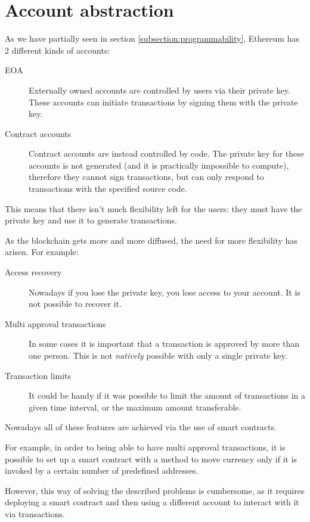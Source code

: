 \documentclass[12pt]{article}
\begin{document}
\section{Account abstraction} \label{section:account_abstraction}
As we have partially seen in section \ref{subsection:programmability}, Ethereum has 2 different kinds of accounts:
\begin{description}
    \item[EOA] Externally owned accounts are controlled by users via their private key. These accounts can initiate transactions by signing them with the private key.
    \item[Contract accounts] Contract accounts are instead controlled by code. The private key for these accounts is not generated (and it is practically impossible to compute), therefore they cannot sign transactions, but can only respond to transactions with the specified source code. 
\end{description}

This means that there isn't much flexibility left for the users: they must have the private key and use it to generate transactions.

As the blockchain gets more and more diffused, the need for more flexibility has arisen. For example:
\begin{description}
    \item[Access recovery] Nowadays if you lose the private key, you lose access to your account. It is not possible to recover it.
    \item[Multi approval transactions] In some cases it is important that a transaction is approved by more than one person. This is not \emph{natively} possible with only a single private key.
    \item[Transaction limits] It could be handy if it was possible to limit the amount of transactions in a given time interval, or the maximum amount transferable. 
\end{description}

Nowadays all of these features are achieved via the use of smart contracts. 

For example, in order to being able to have multi approval transactions, it is possible to set up a smart contract with a method to move currency only if it is invoked by a certain number of predefined addresses.

However, this way of solving the described problems is cumbersome, as it requires deploying a smart contract and then using a different account to interact with it via transactions.
\end{document}
